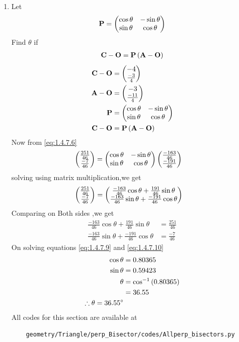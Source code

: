 \documentclass[10pt]{book}
\begin{document}
\begin{enumerate}[label=\thesection.\arabic*.,ref=\thesection.\theenumi]
\item Let 
\begin{align}
\mathbf{P} = \begin{pmatrix}\cos \theta & -\sin \theta \\ \sin \theta & \cos \theta\end{pmatrix}
\end{align}
Find $\theta$ if 
\begin{align}
\mathbf{C}-\mathbf{O}=\mathbf{P}\left(\mathbf{A}-\mathbf{O}\right)
\end{align}
\solution
\begin{align}
    \vec{C}-\vec{O}
          & =\myvec{-4\\\frac{-3}{4}}\\
\vec{A}-\vec{O}
         & =\myvec{-3\\\frac{-11}{4}}\\
\vec{P} &= \myvec{\cos \theta & -\sin \theta \\ \sin \theta & \cos \theta} \\
   \vec{C}-\vec{O}&=\vec{P}\brak{\vec{A}-\vec{O}} \label{eq:1.4.7.6}
\end{align}
 Now from \eqref{eq:1.4.7.6}
 \begin{align}
 \begin{pmatrix}\frac{251}{46} \\\frac{-7}{46}\end{pmatrix}&= \begin{pmatrix}\cos \theta & -\sin \theta \\ \sin \theta & \cos \theta\end{pmatrix} \begin{pmatrix}\frac{-163}{46}\\\frac{-191}{46}\end{pmatrix}    
 \end{align}
solving using matrix multiplication,we get
\begin{align}
    \begin{pmatrix}\frac{251}{46}\\\frac{-7}{46}\end{pmatrix}&=\begin{pmatrix} \frac{-163}{46}\cos\theta + \frac{191}{46}\sin\theta \\ \frac{-163}{46}\sin\theta + \frac{-191}{46}\cos\theta\end{pmatrix}
\end{align}
Comparing on Both sides ,we get
\begin{align}
     \frac{-163}{46}\cos\theta + \frac{191}{46}\sin\theta  &= \frac{251}{46}
     \label{eq:1.4.7.9}\\
 \frac{-163}{46}\sin\theta + \frac{-191}{46}\cos\theta &= \frac{-7}{46}
     \label{eq:1.4.7.10}
\end{align}
On solving equations \eqref{eq:1.4.7.9}  and \eqref{eq:1.4.7.10}
\begin{align}
    \cos\theta&= 0.80365\\
    \sin\theta&= 0.59423 \\
    \theta &=\cos^{-1}\left(0.80365\right) \\
            &= 36.55\\
    \therefore \theta = 36.55\degree
\end{align}
All codes for this section are available at
\begin{lstlisting}
	geometry/Triangle/perp_Bisector/codes/Allperp_bisectors.py
\end{lstlisting}
\end{enumerate}
\end{document}
